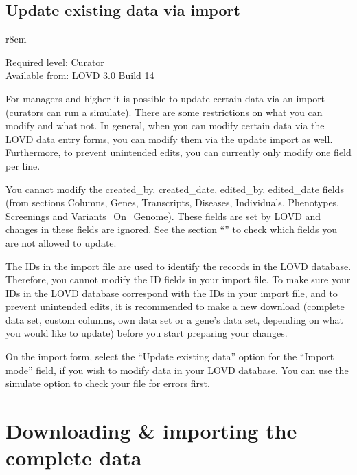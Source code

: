 \subsection{Update existing data via import}
\label{ssec:update_existing_data}
\begin{wrapfigure}[3]{r}{8cm} %
  \vspace{-25pt}
  \begin{leftbar}
    Required level: Curator\\
    Available from: LOVD 3.0 Build 14
  \end{leftbar}
\end{wrapfigure}
For managers and higher it is possible to update certain data via an import (curators can run a simulate).
There are some restrictions on what you can modify and what not.
In general, when you can modify certain data via the LOVD data entry forms,
 you can modify them via the update import as well.
Furthermore, to prevent unintended edits, you can currently only modify one field per line.

You cannot modify the created\_by, created\_date, edited\_by, edited\_date fields
 (from sections Columns, Genes, Transcripts, Diseases, Individuals, Phenotypes, Screenings and Variants\_On\_Genome).
These fields are set by LOVD and changes in these fields are ignored.
See the section ``'' to check which fields you are not allowed to update.

The IDs in the import file are used to identify the records in the LOVD database.
Therefore, you cannot modify the ID fields in your import file.
To make sure your IDs in the LOVD database correspond with the IDs in your import file,
 and to prevent unintended edits, it is recommended to make a new download
 (complete data set, custom columns, own data set or a gene's data set, depending on what you would like to update)
 before you start preparing your changes.

On the import form, select the ``Update existing data'' option for the ``Import mode'' field,
 if you wish to modify data in your LOVD database.
You can use the simulate option to check your file for errors first.





\section{Downloading \& importing the complete data}
\label{sec:download_import_full_data}



